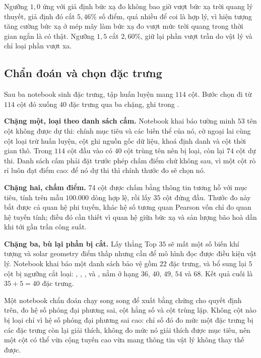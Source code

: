 Ngưỡng $1{,}0$ ứng với giả định bức xạ đo không bao giờ vượt bức xạ trời quang lý thuyết,
giả định đó cắt $5{,}46\%$ số điểm, quá nhiều để coi là hợp lý, vì hiện tượng tăng cường bức
xạ ở mép mây làm bức xạ đo vượt mức trời quang trong thời gian ngắn là có thật. Ngưỡng
$1{,}5$ cắt $2{,}60\%$, giữ lại phần vượt trần do vật lý và chỉ loại phần vượt xa.

\FloatBarrier
\subsection{Chẩn đoán và chọn đặc trưng}

Sau ba notebook sinh đặc trưng, tập huấn luyện mang $114$ cột. Bước chọn đi từ $114$ cột đó
xuống $40$ đặc trưng qua ba chặng, ghi trong .

\textbf{Chặng một, loại theo danh sách cấm.} Notebook khai báo tường minh $53$ tên cột không
được dự thi: chính mục tiêu và các biến thể của nó, cờ ngoại lai cùng cột loại trừ huấn luyện,
cột ghi nguồn gốc dữ liệu, khoá định danh và cột thời gian thô. Trong $114$ cột đầu vào có
$40$ cột trùng tên nên bị loại, còn lại $74$ cột dự thi. Danh sách cấm phải đặt trước phép
chấm điểm chứ không sau, vì một cột rò rỉ luôn đạt điểm cao: để nó dự thi thì chính thước đo
sẽ chọn nó.

\textbf{Chặng hai, chấm điểm.} $74$ cột được chấm bằng thông tin tương hỗ với mục tiêu, tính
trên mẫu $100.000$ dòng hợp lệ, rồi lấy $35$ cột đứng đầu. Thước đo này bắt được cả quan hệ
phi tuyến, khác hệ số tương quan Pearson vốn chỉ đo quan hệ tuyến tính; điều đó cần thiết vì
quan hệ giữa bức xạ và sản lượng bão hoà dần khi tới gần trần công suất.

\textbf{Chặng ba, bù lại phần bị cắt.} Lấy thẳng Top $35$ sẽ mất một số biến khí tượng và
solar geometry điểm thấp nhưng cần để mô hình đọc được điều kiện vật lý. Notebook khai báo
một danh sách bảo vệ gồm $22$ đặc trưng, và bổ sung lại $5$ cột bị ngưỡng cắt loại:
, , ,  và ,
nằm ở hạng $36$, $40$, $49$, $54$ và $68$. Kết quả cuối là $35 + 5 = 40$ đặc trưng.

Một notebook chẩn đoán chạy song song để xuất bằng chứng cho quyết định trên, đo hệ số phóng
đại phương sai, cột hằng số và cột trùng lặp. Không cột nào bị loại chỉ vì hệ số phóng đại
phương sai cao: chỉ số đó đo mức một đặc trưng bị các đặc trưng còn lại giải thích, không đo
mức nó giải thích được mục tiêu, nên một cột có thể vừa cộng tuyến cao vừa mang thông tin
vật lý không thay thế được.

